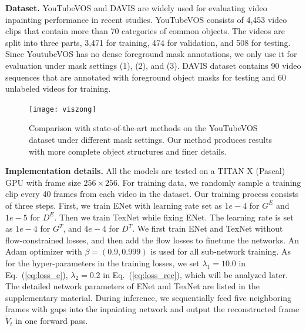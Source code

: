 \noindent\textbf{Dataset.} 
YouTubeVOS and DAVIS are widely used for evaluating video inpainting performance in recent studies.
YouTubeVOS consists of 4,453 video clips that contain more than 70 categories of common objects. 
The videos are split into three parts, 3,471 for training, 474 for validation, and 508 for testing. Since YoutubeVOS has no dense foreground mask annotations, we only use it for evaluation under mask settings (1), (2), and (3). 
% 
DAVIS dataset contains 90 video sequences that are annotated with foreground object masks for testing and 60 unlabeled videos for training.






\begin{figure}[tb]	
\centering	
	\texttt{[image: viszong]} %
	\caption{Comparison with state-of-the-art methods on the YouTubeVOS dataset under different mask settings. Our method 	produces results with more complete object structures and finer details.}	
\label{viszong}
\end{figure}



\noindent \textbf{Implementation details.} 
All the models are tested on a TITAN X (Pascal) GPU with frame size $256 \times 256$.
For training data, we randomly sample a training clip every 40 frames from each video in the dataset. Our training process consists of three steps. First, we train ENet with learning rate set as $1e-4$ for $G^E$ and $1e-5$ for $D^E$. 
Then we train TexNet while fixing ENet. The learning rate is set as $1e-4$ for $G^T$, and $4e-4$ for $D^T$.
We first train ENet and TexNet without flow-constrained losses, and then add the flow losses to finetune the networks.
An Adam optimizer with $\beta=(0.9, 0.999)$ is used for all sub-network training.
As for the hyper-parameters in the training losses, we set $\lambda_1=10.0$ in Eq.~(\ref{eq:loss_e}), $\lambda_2=0.2$ in Eq.~(\ref{eq:loss_rec}), which will be analyzed later. 
{\color{blue} The detailed network parameters of ENet and TexNet are listed in the supplementary material.
During inference, we sequentially feed five neighboring frames with gaps into the inpainting network and output the reconstructed frame $\widetilde{V}_t$ in one forward pass.
}

